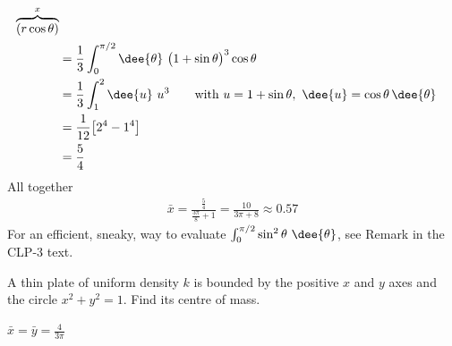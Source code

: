 \begin{solution}
\begin{align*}
   \overbrace{(r\cos\theta)}^{x} \\
&=\frac{1}{3} \int_0^{\pi/2}\dee{\theta}\ \big(1+\sin\theta\big)^3\cos\theta\\
&=\frac{1}{3}\int_1^2\dee{u}\ u^3\qquad\text{with }u=1+\sin\theta,\ 
                                       \dee{u} = \cos\theta\,\dee{\theta}  \\
&=\frac{1}{12}\big[2^4-1^4\big] \\
&=\frac{5}{4}
\end{align*}
All together
\begin{align*}
\bar x = \frac{\frac{5}{4}}{\frac{3\pi}{8} + 1}
=\frac{10}{3\pi+8}
\approx 0.57
\end{align*}
For an efficient, sneaky, way to evaluate  
$\int_0^{\pi/2}\sin^2\theta\ \dee{\theta}$,
see Remark  in the CLP-3 text.
\end{solution}

\begin{question}[M200 2010A] %
A thin plate of uniform density $k$ is bounded by the positive $x$ and $y$ 
axes and the circle $x^2 + y^2 = 1$. Find its centre of mass.
\end{question}

%

\begin{answer}
$\bar x = \bar y =\frac{4}{3\pi}$
\end{answer}

